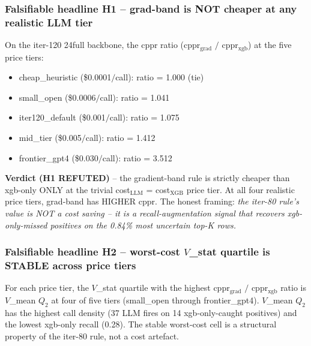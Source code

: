 \documentclass{article}
\begin{document}
\subsubsection{Falsifiable headline H1 -- grad-band is NOT cheaper at any
  realistic LLM tier}
On the iter-120 24full backbone, the cppr ratio
(cppr$_{\text{grad}}$ $/$ cppr$_{\text{xgb}}$) at the five price tiers:
\begin{itemize}
\item cheap\_heuristic (\$0.0001$/$call): ratio = 1.000 (tie)
\item small\_open    (\$0.0006$/$call): ratio = 1.041
\item iter120\_default (\$0.001$/$call): ratio = 1.075
\item mid\_tier      (\$0.005$/$call):  ratio = 1.412
\item frontier\_gpt4 (\$0.030$/$call):  ratio = 3.512
\end{itemize}
\textbf{Verdict (H1 REFUTED)} -- the gradient-band rule is strictly
cheaper than xgb-only ONLY at the trivial cost$_{\text{LLM}}$ = cost$_{\text{XGB}}$
price tier.  At all four realistic price tiers, grad-band has HIGHER cppr.
The honest framing: \emph{the iter-80 rule's value is NOT a cost saving --
it is a recall-augmentation signal that recovers xgb-only-missed positives
on the 0.84\% most uncertain top-K rows.}

\subsubsection{Falsifiable headline H2 -- worst-cost $V$\_stat quartile is
  STABLE across price tiers}
For each price tier, the $V$\_stat quartile with the highest
cppr$_{\text{grad}}$ $/$ cppr$_{\text{xgb}}$ ratio is $V$\_mean $Q_2$ at
four of five tiers (small\_open through frontier\_gpt4).
$V$\_mean $Q_2$ has the highest call density (37 LLM fires on 14
xgb-only-caught positives) and the lowest xgb-only recall (0.28).
The stable worst-cost cell is a structural property of the iter-80
rule, not a cost artefact.
\end{document}

